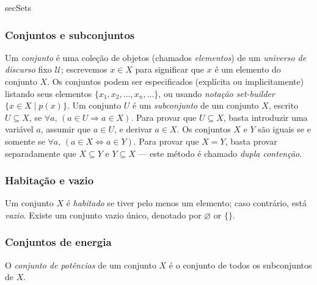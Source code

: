\begin{tldr}{secSets}

\subsubsection*{Conjuntos e subconjuntos}

\begin{tldrlist}
 Um \textit{conjunto} é uma coleção de objetos (chamados \textit{elementos}) de um \textit{universo de discurso} fixo $\mathcal{U}$; escrevemos $x \in X$ para significar que $x$ é um elemento do conjunto $X$. Os conjuntos podem ser especificados (explícita ou implicitamente) listando seus elementos $\{ x_1, x_2, \dots, x_n, \dots \}$, ou usando \textit{notação set-builder} $\{ x \in X \mid p(x) \}$.
 Um conjunto $U$ é um \textit{subconjunto} de um conjunto $X$, escrito $U \subseteq X$, se $\forall a,\, (a \in U \Rightarrow a \in X)$. Para provar que $U \subseteq X$, basta introduzir uma variável $a$, assumir que $a \in U$, e derivar $a \in X$.
 Os conjuntos $X$ e $Y$ são iguais se e somente se $\forall a,\, (a \in X \Leftrightarrow a \in Y)$. Para provar que $X = Y$, basta provar separadamente que $X \subseteq Y$ e $Y \subseteq X$ --- este método é chamado \textit{dupla contenção}.
\end{tldrlist}

\subsubsection*{Habitação e vazio}

\begin{tldrlist}
 Um conjunto $X$ é \textit{habitado} se tiver pelo menos um elemento; caso contrário, está \textit{vazio}.
 Existe um conjunto vazio único, denotado por $\varnothing$ or $\{ \}$.
\end{tldrlist}

\subsubsection*{Conjuntos de energia}
\begin{tldrlist}
 O \textit{conjunto de potências} de um conjunto $X$ é o conjunto de todos os subconjuntos de $X$.
\end{tldrlist}
\end{tldr}
